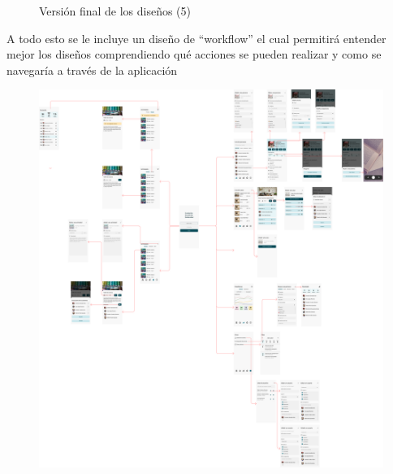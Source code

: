 \begin{figure}[hp!]
    \caption{Versión final de los diseños (5)}
    \label{fig:dis-fin5}

\end{figure}

\newpage

A todo esto se le incluye un diseño de ``workflow'' el cual permitirá entender mejor los diseños comprendiendo qué acciones se pueden realizar y como se navegaría a través de la aplicación

\begin{figure}[h!]
    \centering
    \includegraphics[width=\linewidth]{diseno/app/presentacion/workflow.png}
\end{figure}
